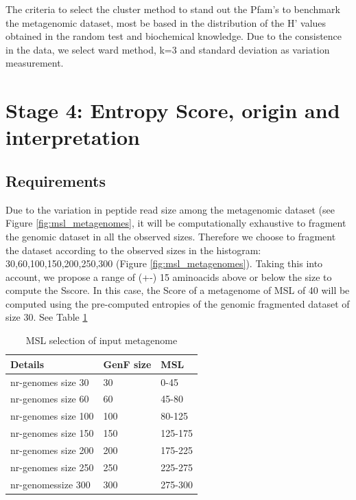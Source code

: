 \documentclass[12pt]{report}
\begin{document}
The criteria to select the cluster method to stand out the Pfam’s to benchmark
the metagenomic dataset,  most be based in the distribution of the H’ values
obtained in the random test and biochemical knowledge. Due to the consistence
in the data, we select ward method, k=3 and standard deviation as variation
measurement. 

\section{Stage 4: Entropy Score, origin and interpretation}

\subsection{Requirements}

Due to the variation in peptide read size among the metagenomic dataset (see
Figure \ref{fig:msl_metagenomes}, it will be computationally exhaustive to
fragment the genomic dataset in all the observed sizes. Therefore we choose to
fragment the dataset according to the observed sizes in the histogram:
30,60,100,150,200,250,300 (Figure \ref{fig:msl_metagenomes}). Taking this into
account, we propose a range of (+-) 15 aminoacids above or below the size to
compute the Sscore. In this case, the Score of  a metagenome of MSL of 40 will
be computed using the pre-computed entropies of the genomic fragmented dataset
of size 30. See Table \ref{MSL-input}

\begin{table}[H]
\centering
\caption{MSL selection of input metagenome}
\label{MSL-input}
\begin{tabular}{@{}lll@{}}
\toprule
Details             & GenF size & MSL     \\ \midrule
nr-genomes size 30  & 30        & 0-45    \\
nr-genomes size 60  & 60        & 45-80   \\
nr-genomes size 100 & 100       & 80-125  \\
nr-genomes size 150 & 150       & 125-175 \\
nr-genomes size 200 & 200       & 175-225 \\
nr-genomes size 250 & 250       & 225-275 \\
nr-genomessize 300  & 300       & 275-300 \\ \bottomrule
\end{tabular}
\end{table}
\end{document}
